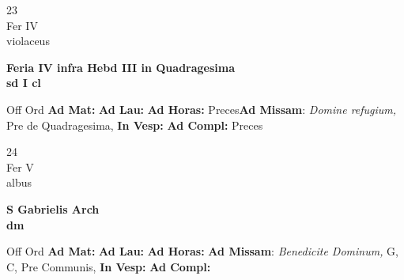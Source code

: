 \documentclass[10pt, openany]{book}
\begin{document}
        \begin{center}
            \begin{minipage}{3.5in}
                \vspace{2em}
                \begin{minipage}{0.5in}
                    {\Huge 23} \\
                    {\normalsize Fer IV} \\
                    {\normalsize violaceus}
                \end{minipage}
                \begin{minipage}{3.0in}
                    \textbf{ \large Feria IV infra Hebd III in Quadragesima \\
                    \textnormal{\normalsize sd I cl}} \\ 
                \end{minipage}
                \begin{justify}Off Ord
                    \textbf{Ad Mat: }
                    \textbf{Ad Lau: }
                    \textbf{Ad Horas: }Preces\textbf{Ad Missam}: \textit{Domine refugium,} Pre de Quadragesima,  
                    \textbf{In Vesp: }
                    \textbf{Ad Compl: }Preces
                \end{justify}
            \end{minipage}
        \end{center}
    
        \begin{center}
            \begin{minipage}{3.5in}
                \vspace{2em}
                \begin{minipage}{0.5in}
                    {\Huge 24} \\
                    {\normalsize Fer V} \\
                    {\normalsize albus}
                \end{minipage}
                \begin{minipage}{3.0in}
                    \textbf{ \large S Gabrielis Arch \\
                    \textnormal{\normalsize dm}} \\ 
                \end{minipage}
                \begin{justify}Off Ord
                    \textbf{Ad Mat: }
                    \textbf{Ad Lau: }
                    \textbf{Ad Horas: }\textbf{Ad Missam}: \textit{Benedicite Dominum,} G, C, Pre Communis,  
                    \textbf{In Vesp: }
                    \textbf{Ad Compl: }
                \end{justify}
            \end{minipage}
        \end{center}
    
\end{document}
